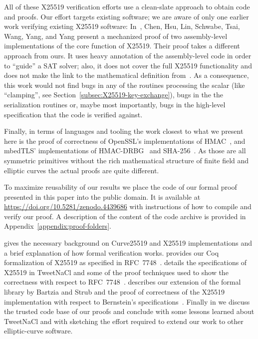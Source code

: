 All of these X25519 verification efforts use a clean-slate approach to obtain code and proofs.
Our effort targets existing software; we are aware of only one earlier work verifying existing X25519 software:
In~\cite{Chen2014VerifyingCS}, Chen, Hsu, Lin, Schwabe, Tsai, Wang, Yang, and Yang present
a mechanized proof of two assembly-level implementations of the core function of X25519.
Their proof takes a different approach from ours.
It uses heavy annotation of the assembly-level code in order to ``guide'' a SAT solver;
also, it does not cover the full X25519 functionality and does
not make the link to the mathematical definition from~\cite{Ber06}.
As a consequence, this work would not find bugs in any of the routines
processing the scalar (like ``clamping'', see Section~\ref{subsec:X25519-key-exchange}),
bugs in the the serialization routines or, maybe most importantly,
bugs in the high-level specification that the code is verified against.

Finally, in terms of languages and tooling the work closest to what we present here
is the proof of correctness of OpenSSL's
implementations of HMAC~\cite{Beringer2015VerifiedCA},
and mbedTLS' implementations of
HMAC-DRBG~\cite{2017-Ye} and SHA-256~\cite{2015-Appel}.
As those are all symmetric primitives without the rich mathematical
structure of finite field and elliptic curves the actual proofs are quite different.

To maximize reusability of our results we place the code of our formal proof
presented in this paper into the public domain.
It is available at \url{https://doi.org/10.5281/zenodo.4439686}
with instructions of how to compile and verify our proof.
A description of the content of the code archive is provided in
Appendix~\ref{appendix:proof-folders}.

 gives the necessary background on Curve25519 and X25519
implementations and a brief explanation of how formal verification works.
 provides our Coq formalization of X25519 as specified in RFC~7748~\cite{rfc7748}.
 details the specifications of X25519 in TweetNaCl and some of the
proof techniques used to show the correctness with respect to RFC~7748~\cite{rfc7748}.
 describes our extension of the formal library by Bartzia
and Strub and the proof of correctness of the X25519 implementation with respect to Bernstein's
specifications~\cite{Ber14}.
Finally in  we discuss the trusted code base of our proofs
and conclude with some lessons learned about TweetNaCl and with sketching the
effort required to extend our work to other elliptic-curve software.

